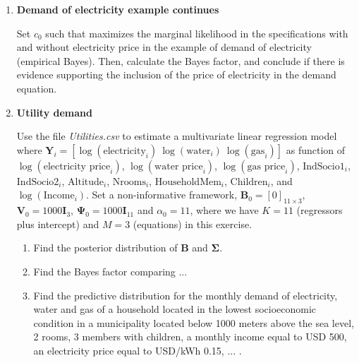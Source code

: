 \begin{enumerate}
\item \textbf{Demand of electricity example continues}

Set $c_0$ such that maximizes the marginal likelihood in the specifications with and without electricity price in the example of demand of electricity (empirical Bayes). Then, calculate the Bayes factor, and conclude if there is evidence supporting the inclusion of the price of electricity in the demand equation.

\item \textbf{Utility demand}

Use the file \textit{Utilities.csv} to estimate a multivariate linear regression model where $\mathbf{Y}_i=\left[\log(\text{electricity}_i) \ \log(\text{water}_i) \ \log(\text{gas}_i)\right]$ as function of $\log(\text{electricity price}_i)$, $\log(\text{water price}_i)$, $\log(\text{gas price}_i)$, $\text{IndSocio1}_i$, $\text{IndSocio2}_i$, $\text{Altitude}_i$, $\text{Nrooms}_i$, $\text{HouseholdMem}_i$, $\text{Children}_i$, and $\log(\text{Income}_i)$. Set a non-informative framework, $\mathbf{B}_0=\left[0\right]_{11\times 3}$, $\mathbf{V}_0=1000 \mathbf{I}_{3}$, $\mathbf{\Psi}_0=1000 \mathbf{I}_{11}$ and $\alpha_0=11$, where we have $K=11$ (regressors plus intercept) and $M=3$ (equations) in this exercise.

\begin{enumerate}
	\item Find the posterior distribution of $\mathbf{B}$ and $\mathbf{\Sigma}$.
	\item Find the Bayes factor comparing ...
	\item Find the predictive distribution for the monthly demand of electricity, water and gas of a household located in the lowest socioeconomic condition in a municipality located below 1000 meters above the sea level, 2 rooms, 3 members with children, a monthly income equal to USD 500, an electricity price equal to USD/kWh 0.15, ... . 
\end{enumerate}   
	

\end{enumerate}



